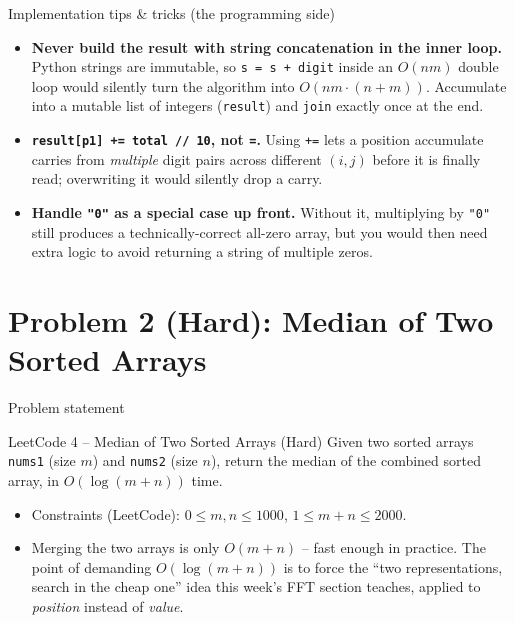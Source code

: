 \documentclass[11pt,aspectratio=169]{beamer}
\begin{document}
\begin{frame}{Implementation tips \& tricks (the programming side)}
  \small
  \begin{itemize}
    \item \textbf{Never build the result with string concatenation in the inner loop.}
    Python strings are immutable, so \texttt{s = s + digit} inside an $O(nm)$ double loop
    would silently turn the algorithm into $O(nm \cdot (n+m))$. Accumulate into a mutable
    list of integers (\texttt{result}) and \texttt{join} exactly once at the end.
    \item \textbf{\texttt{result[p1] += total // 10}, not \texttt{=}.} Using \texttt{+=}
    lets a position accumulate carries from \emph{multiple} digit pairs across different
    $(i,j)$ before it is finally read; overwriting it would silently drop a carry.
    \item \textbf{Handle \texttt{"0"} as a special case up front.} Without it, multiplying
    by \texttt{"0"} still produces a technically-correct all-zero array, but you would
    then need extra logic to avoid returning a string of multiple zeros.
  \end{itemize}
\end{frame}

\section{Problem 2 (Hard): Median of Two Sorted Arrays}

\begin{frame}{Problem statement}
  \begin{block}{LeetCode 4 -- Median of Two Sorted Arrays (\textcolor{red!60!black}{Hard})}
    Given two sorted arrays \texttt{nums1} (size $m$) and \texttt{nums2} (size $n$),
    return the median of the combined sorted array, in $O(\log(m+n))$ time.
  \end{block}
  \begin{itemize}
    \item Constraints (LeetCode): $0 \le m, n \le 1000$, $1 \le m+n \le 2000$.
    \item Merging the two arrays is only $O(m+n)$ -- fast enough in practice. The point
    of demanding $O(\log(m+n))$ is to force the ``two representations, search in the
    cheap one'' idea this week's FFT section teaches, applied to \emph{position} instead
    of \emph{value}.
  \end{itemize}
\end{frame}
\end{document}
